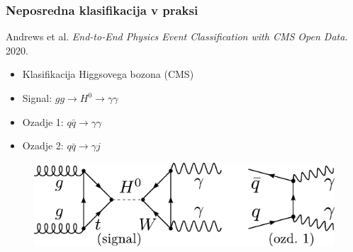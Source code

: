 \documentclass[14pt, t]{beamer}
\begin{document}
\begin{frame}
    \frametitle{Neposredna klasifikacija v praksi}

    Andrews et al. \textit{End-to-End Physics Event Classification with CMS Open Data}. 2020. \cite{andrews-higgs}

    \begin{itemize}
    
        \item Klasifikacija Higgsovega bozona (CMS)

        \item Signal: $ gg \to H^{0} \to \gamma \gamma $

        \item Ozadje 1: $ q \bar{q} \to \gamma \gamma $

        \item Ozadje 2: $ q \bar{q} \to \gamma j $
    
    \end{itemize}

    \begin{figure}[htb!]
        \centering
        \includegraphics[width=\linewidth]{vector/figures-slo/feynman.pdf}
    \end{figure}
    
\end{frame}
\end{document}
